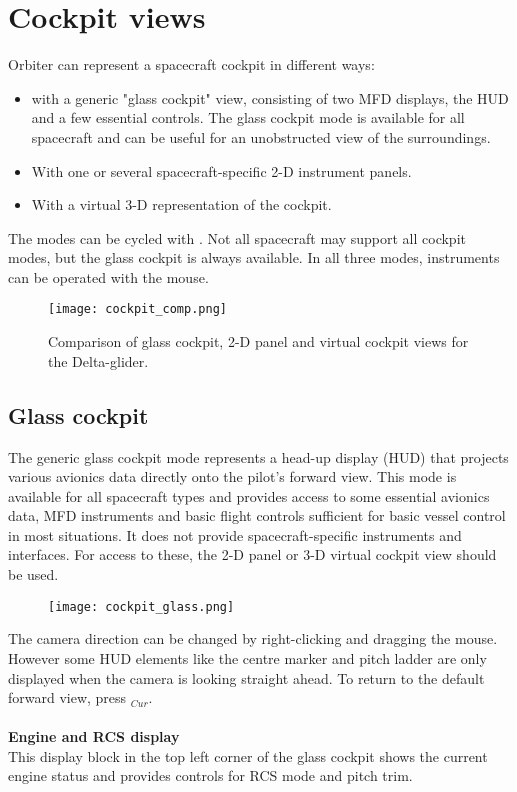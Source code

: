 \documentclass[Orbiter User Manual.tex]{subfiles}
\begin{document}
\section{Cockpit views}
Orbiter can represent a spacecraft cockpit in different ways:

\begin{itemize}
\item with a generic "glass cockpit" view, consisting of two MFD displays, the HUD and a few essential controls. The glass cockpit mode is available for all spacecraft and can be useful for an unobstructed view of the surroundings.
\item With one or several spacecraft-specific 2-D instrument panels.
\item With a virtual 3-D representation of the cockpit.
\end{itemize}

\noindent
The modes can be cycled with . Not all spacecraft may support all cockpit modes, but the glass cockpit is always available. In all three modes, instruments can be operated with the mouse.

\begin{figure}[H]
  \centering
  \texttt{[image: cockpit\_comp.png]}
  \caption{Comparison of glass cockpit, 2-D panel and virtual cockpit views for the Delta-glider.}
\end{figure}


\subsection{Glass cockpit}
The generic glass cockpit mode represents a head-up display (HUD) that projects various avionics data directly onto the pilot's forward view. This mode is available for all spacecraft types and provides access to some essential avionics data, MFD instruments and basic flight controls sufficient for basic vessel control in most situations. It does not provide spacecraft-specific instruments and interfaces. For access to these, the 2-D panel or 3-D virtual cockpit view should be used.

\begin{figure}[H]
  \centering
  \texttt{[image: cockpit\_glass.png]}
\end{figure}

\noindent
The camera direction can be changed by right-clicking and dragging the mouse. However some HUD elements like the centre marker and pitch ladder are only displayed when the camera is looking straight ahead. To return to the default forward view, press \Home$_{Cur}$.\\
\\
\textbf{Engine and RCS display}\\
This display block in the top left corner of the glass cockpit shows the current engine status and provides controls for RCS mode and pitch trim.
\end{document}
